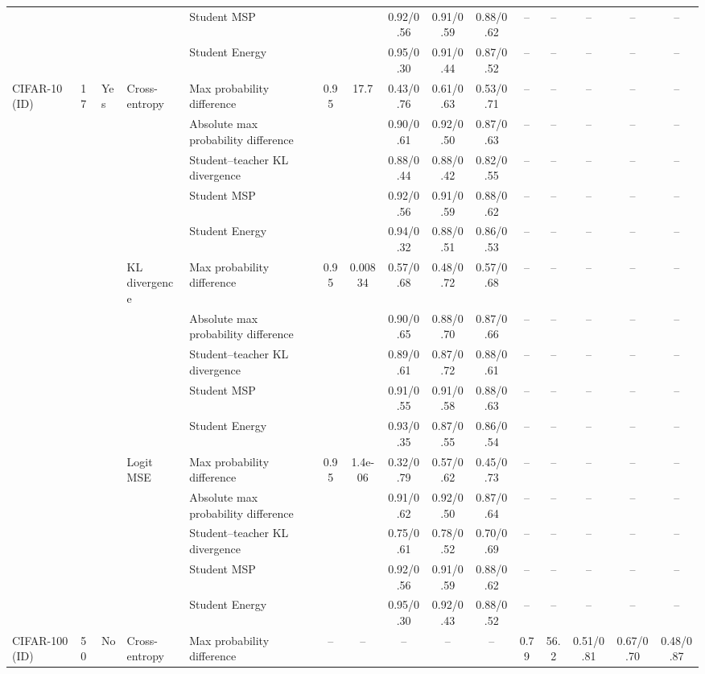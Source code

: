 \documentclass[border=2pt]{standalone}
\begin{document}
\begin{tabular}{lllllcccccccccc}
 &  &  &  & Student MSP &  &  & 0.92/0.56 & 0.91/0.59 & 0.88/0.62 & -- & -- & -- & -- & -- \\
 &  &  &  & Student Energy &  &  & 0.95/0.30 & 0.91/0.44 & 0.87/0.52 & -- & -- & -- & -- & -- \\
\addlinespace
CIFAR-10 (ID) & 17 & Yes & Cross-entropy & Max probability difference & 0.95 & 17.7 & 0.43/0.76 & 0.61/0.63 & 0.53/0.71 & -- & -- & -- & -- & -- \\
 &  &  &  & Absolute max probability difference &  &  & 0.90/0.61 & 0.92/0.50 & 0.87/0.63 & -- & -- & -- & -- & -- \\
 &  &  &  & Student--teacher KL divergence &  &  & 0.88/0.44 & 0.88/0.42 & 0.82/0.55 & -- & -- & -- & -- & -- \\
 &  &  &  & Student MSP &  &  & 0.92/0.56 & 0.91/0.59 & 0.88/0.62 & -- & -- & -- & -- & -- \\
 &  &  &  & Student Energy &  &  & 0.94/0.32 & 0.88/0.51 & 0.86/0.53 & -- & -- & -- & -- & -- \\
 &  &  & KL divergence & Max probability difference & 0.95 & 0.00834 & 0.57/0.68 & 0.48/0.72 & 0.57/0.68 & -- & -- & -- & -- & -- \\
 &  &  &  & Absolute max probability difference &  &  & 0.90/0.65 & 0.88/0.70 & 0.87/0.66 & -- & -- & -- & -- & -- \\
 &  &  &  & Student--teacher KL divergence &  &  & 0.89/0.61 & 0.87/0.72 & 0.88/0.61 & -- & -- & -- & -- & -- \\
 &  &  &  & Student MSP &  &  & 0.91/0.55 & 0.91/0.58 & 0.88/0.63 & -- & -- & -- & -- & -- \\
 &  &  &  & Student Energy &  &  & 0.93/0.35 & 0.87/0.55 & 0.86/0.54 & -- & -- & -- & -- & -- \\
 &  &  & Logit MSE & Max probability difference & 0.95 & 1.4e-06 & 0.32/0.79 & 0.57/0.62 & 0.45/0.73 & -- & -- & -- & -- & -- \\
 &  &  &  & Absolute max probability difference &  &  & 0.91/0.62 & 0.92/0.50 & 0.87/0.64 & -- & -- & -- & -- & -- \\
 &  &  &  & Student--teacher KL divergence &  &  & 0.75/0.61 & 0.78/0.52 & 0.70/0.69 & -- & -- & -- & -- & -- \\
 &  &  &  & Student MSP &  &  & 0.92/0.56 & 0.91/0.59 & 0.88/0.62 & -- & -- & -- & -- & -- \\
 &  &  &  & Student Energy &  &  & 0.95/0.30 & 0.92/0.43 & 0.88/0.52 & -- & -- & -- & -- & -- \\
\addlinespace
CIFAR-100 (ID) & 50 & No & Cross-entropy & Max probability difference & -- & -- & -- & -- & -- & 0.79 & 56.2 & 0.51/0.81 & 0.67/0.70 & 0.48/0.87 \\

\end{tabular}
\end{document}
